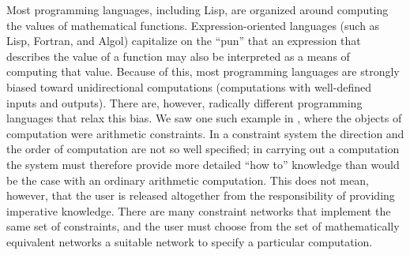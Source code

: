 Most programming languages, including Lisp, are organized around computing the
values of mathematical functions.  Expression-oriented languages (such as Lisp,
Fortran, and Algol) capitalize on the ``pun'' that an expression that describes
the value of a function may also be interpreted as a means of computing that
value.  Because of this, most programming languages are strongly biased toward
unidirectional computations (computations with well-defined inputs and
outputs).  There are, however, radically different programming languages that
relax this bias.  We saw one such example in , where the
objects of computation were arithmetic constraints.  In a constraint system the
direction and the order of computation are not so well specified; in carrying
out a computation the system must therefore provide more detailed ``how to''
knowledge than would be the case with an ordinary arithmetic computation.  This
does not mean, however, that the user is released altogether from the
responsibility of providing imperative knowledge.  There are many constraint
networks that implement the same set of constraints, and the user must choose
from the set of mathematically equivalent networks a suitable network to
specify a particular computation.

